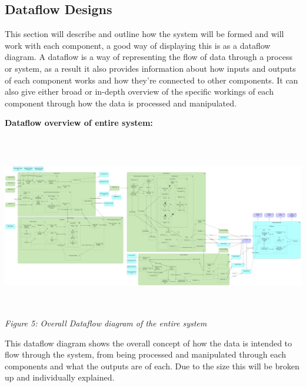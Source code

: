 \documentclass[oneside, 10pt]{article}
\begin{document}
		\subsection{Dataflow Designs}
		This section will describe and outline how the system will be formed and will work with each component, a good way of displaying this is as a dataflow diagram. A dataflow is a way of representing the flow of data through a process or system, as a result it also provides information about how inputs and outputs of each component works and how they're connected to other components. It can also give either broad or in-depth overview of the specific workings of each component through how the data is processed and manipulated.
		\newline
		
		\textbf{Dataflow overview of entire system:}
		\begin{center}
			\includegraphics[width=18cm,height=8cm]{images/Dataflow.png}
			\textit{Figure 5: Overall Dataflow diagram of the entire system}
		\end{center}
		This dataflow diagram shows the overall concept of how the data is intended to flow through the system, from being processed and manipulated through each components and what the outputs are of each. Due to the size this will be broken up and individually explained.
		\newpage
		
\end{document}
